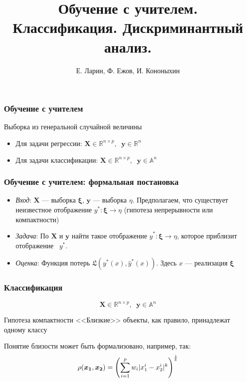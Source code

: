 \documentclass[11pt]{beamer}
\begin{document}
	\author{Е. Ларин, Ф. Ежов, И. Кононыхин }
	\title[Machine Learning] {Обучение с учителем. Классификация. Дискриминантный анализ. }
	\date{}
	\subject{Семинар по статистическому и машинному обучению}
	\begin{frame}[plain]
		\maketitle 
	\end{frame}
	
	\begin{frame}
		\frametitle{Обучение с учителем}
		
		Выборка из генеральной случайной величины
		\begin{itemize}
			\item Для задачи регрессии: $\bm{X} \in \mathbb{R}^{n\times p}, \;\;\mathbf{y}\in \mathbb{R}^n$
		    \item Для задачи классификации: $\bm{X} \in \mathbb{R}^{n\times p}, \;\;\mathbf{y}\in \mathbb{A}^n$
        \end{itemize}
		
	\end{frame}
	\begin{frame}
		\frametitle{Обучение с учителем: формальная постановка}
		\begin{itemize}
			\item \textit{Вход}: $\bm{X}$ --- выборка $\bm{\xi}$, $\bm{y}$ --- выборка $\eta$. Предполагаем, что существует неизвестное отображение $y^*: \bm{\xi} \to \eta$  (гипотеза непрерывности или компактности)
			
			\item \textit{Задача}: По $\bm{X}$ и $\bm{y}$ найти такое отображение $\hat{y}^*: \bm{\xi} \to \eta$, которое приблизит отображение  $y^*$. 
			
			\item \textit{Оценка}: Функция потерь $\mathfrak{L}(y^*(x), \hat{y}^*(x))$. Здесь $x$ --- реализация $\bm{\xi}$
		\end{itemize}
	\end{frame}
	
	\begin{frame}
		\frametitle{Классификация}
		\begin{equation}
			\bm{X} \in \mathbb{R}^{n\times p}, \;\;\mathbf{y}\in \mathbb{A}^n
		\end{equation}
		\begin{block}{Гипотеза компактности}
			<<Близкие>> объекты, как правило, принадлежат одному классу
		\end{block}
		Понятие близости может быть формализовано, например, так:
		$$\rho(\bm{x_1}, \bm{x_2}) = \left(\displaystyle{\sum_{i = 1}^p w_i|x_1^i - x_2^i|^k}\right)^{{1}\over {k}}$$
	\end{frame}
\end{document}
